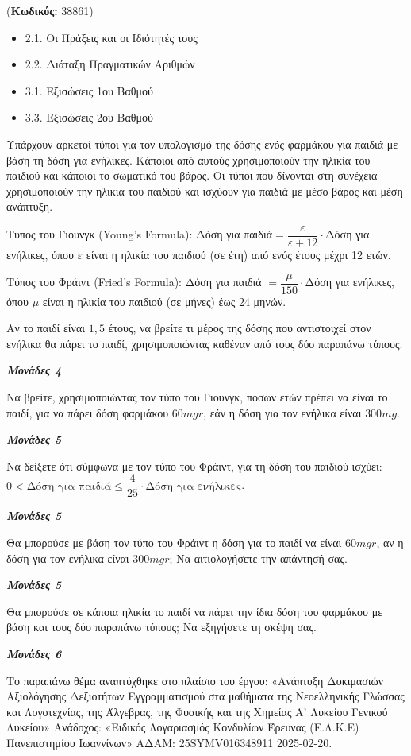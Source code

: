 \documentclass[11pt,a4paper,twoside]{book}
\newcounter{askhsh}[chapter]
\renewcommand{\theaskhsh}{
	\bf{\titlefont{\Large{\thechapter}}.\arabic{askhsh}}
}
\newcommand{\Askhsh}[2]{\refstepcounter{askhsh}{\titlefont{Άσκηση\theaskhsh} - \textcolor{maincolor}{ΘΕΜΑ #2}} ({\small{\textbf{Κωδικός:} #1}})\\}{}
\newenvironment{ylh}{
\begin{tcolorbox}[
breakable,
enhanced standard,
titlerule=0pt,
toprule=0pt, 
rightrule=0pt, 
bottomrule=0pt,
title={\titlefont Ύλη άσκησης},
colback=white,
opacityback=0,
left=2mm,
top=1mm,
bottom=0mm,
boxrule=0pt,
colframe=white,
borderline west={1.5mm}{0pt}{secondarycolor},
leftrule=2mm,
sharp corners,
coltitle=black
]
\begin{itemize}[leftmargin=3mm, itemsep=0mm, label=\textcolor{secondarycolor}{{\small\faBook}}]
}{
\end{itemize}
\end{tcolorbox}
}
\newcommand{\monades}[1]{
\hspace*{\fill}
\textbf{\textit{\textcolor{maincolor}{Μονάδες #1}}}}
\begin{document}
\vspace{4mm}
\Askhsh{38861}{4}
\begin{ylh}
    \item 2.1. Οι Πράξεις και οι Ιδιότητές τους
    \item 2.2. Διάταξη Πραγματικών Αριθμών
    \item 3.1. Εξισώσεις 1ου Βαθμού
    \item 3.3. Εξισώσεις 2ου Βαθμού
\end{ylh}

Υπάρχουν αρκετοί τύποι για τον υπολογισμό της δόσης ενός φαρμάκου για παιδιά με βάση τη δόση για ενήλικες. Κάποιοι από αυτούς χρησιμοποιούν την ηλικία του παιδιού και κάποιοι το σωματικό του βάρος. Οι τύποι που δίνονται στη συνέχεια χρησιμοποιούν την ηλικία του παιδιού και ισχύουν για παιδιά με μέσο βάρος και μέση ανάπτυξη.

Τύπος του Γιουνγκ (Young's Formula): Δόση για παιδιά$ = \dfrac{\varepsilon}{\varepsilon + 12} \cdot $Δόση για ενήλικες, όπου $\varepsilon$ είναι η ηλικία του παιδιού (σε έτη) από ενός έτους μέχρι 12 ετών.

Τύπος του Φράιντ (Fried's Formula): Δόση για παιδιά $ = \dfrac{\mu}{150} \cdot $Δόση για ενήλικες, όπου $\mu$ είναι η ηλικία του παιδιού (σε μήνες) έως 24 μηνών.
\begin{alist}
\item Αν το παιδί είναι $1,5$ έτους, να βρείτε τι μέρος της δόσης που αντιστοιχεί στον ενήλικα θα πάρει το παιδί, χρησιμοποιώντας καθέναν από τους δύο παραπάνω τύπους.
\monades{4}
\item
\begin{rlist}
\item Να βρείτε, χρησιμοποιώντας τον τύπο του Γιουνγκ, πόσων ετών πρέπει να είναι το παιδί, για να πάρει δόση φαρμάκου $60\si{mgr}$, εάν η δόση για τον ενήλικα είναι $300\si{mg}$.
\monades{5}
\item Να δείξετε ότι σύμφωνα με τον τύπο του Φράιντ, για τη δόση του παιδιού ισχύει:
$0 < \text{Δόση για παιδιά} \leq \dfrac{4}{25} \cdot \text{Δόση για ενήλικες}$.
\monades{5}
\item Θα μπορούσε με βάση τον τύπο του Φράιντ η δόση για το παιδί να είναι $60\si{mgr}$, αν η δόση για τον ενήλικα είναι $300\si{mgr}$; Να αιτιολογήσετε την απάντησή σας.
\monades{5}
\end{rlist}
\item Θα μπορούσε σε κάποια ηλικία το παιδί να πάρει την ίδια δόση του φαρμάκου με βάση και τους δύο παραπάνω τύπους; Να εξηγήσετε τη σκέψη σας.
\monades{6}

{\footnotesize Το παραπάνω θέμα αναπτύχθηκε στο πλαίσιο του έργου: «Ανάπτυξη Δοκιμασιών Αξιολόγησης Δεξιοτήτων Εγγραμματισμού στα μαθήματα της Νεοελληνικής Γλώσσας και Λογοτεχνίας, της Άλγεβρας, της Φυσικής και της Χημείας Α' Λυκείου Γενικού Λυκείου» Ανάδοχος: «Ειδικός Λογαριασμός Κονδυλίων Έρευνας (Ε.Λ.Κ.Ε) Πανεπιστημίου Ιωαννίνων» ΑΔΑΜ: 25SYMV016348911 2025-02-20.}
\end{alist}
\end{document}
